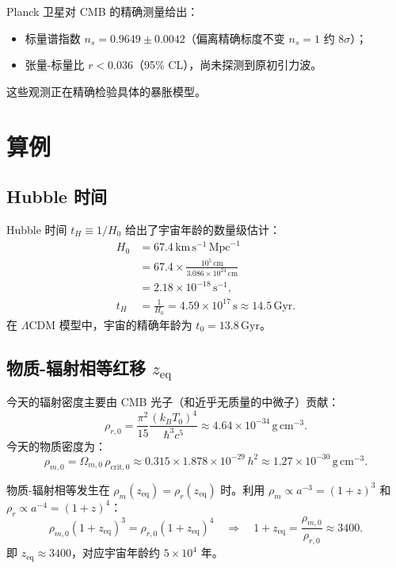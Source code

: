 \begin{note}[暴胀的观测检验]
Planck 卫星对 CMB 的精确测量给出：
\begin{itemize}
    \item 标量谱指数 $n_s = 0.9649 \pm 0.0042$（偏离精确标度不变 $n_s=1$ 约 $8\sigma$）；
    \item 张量-标量比 $r < 0.036$（95\% CL），尚未探测到原初引力波。
\end{itemize}
这些观测正在精确检验具体的暴胀模型。
\end{note}

\section{算例}
\label{sec:examples_cosmo}

\subsection{Hubble 时间}

Hubble 时间 $t_H \equiv 1/H_0$ 给出了宇宙年龄的数量级估计：
\begin{align}
    H_0 &= 67.4 \,\text{km}\,\text{s}^{-1}\,\text{Mpc}^{-1} \nonumber\\
        &= 67.4 \times \frac{10^5\,\text{cm}}{3.086 \times 10^{24}\,\text{cm}} \nonumber\\
        &= 2.18 \times 10^{-18} \,\text{s}^{-1}, \nonumber\\
    t_H &= \frac{1}{H_0} = 4.59 \times 10^{17}\,\text{s} \approx 14.5 \,\text{Gyr}.
\end{align}
在 $\Lambda$CDM 模型中，宇宙的精确年龄为 $t_0 = 13.8\,\text{Gyr}$。

\subsection{物质-辐射相等红移 $z_{\text{eq}}$}

\begin{example}[计算 $z_{\text{eq}}$]
今天的辐射密度主要由 CMB 光子（和近乎无质量的中微子）贡献：
\begin{equation}
    \rho_{r,0} = \frac{\pi^2}{15} \frac{(k_B T_0)^4}{\hbar^3 c^5} \approx 4.64 \times 10^{-34} \,\text{g}\,\text{cm}^{-3}.
\end{equation}
今天的物质密度为：
\begin{equation}
    \rho_{m,0} = \Omega_{m,0} \,\rho_{\text{crit},0} \approx 0.315 \times 1.878 \times 10^{-29} \,h^2 \approx 1.27 \times 10^{-30} \,\text{g}\,\text{cm}^{-3}.
\end{equation}

物质-辐射相等发生在 $\rho_m(z_{\text{eq}}) = \rho_r(z_{\text{eq}})$ 时。利用 $\rho_m \propto a^{-3} = (1+z)^3$ 和 $\rho_r \propto a^{-4} = (1+z)^4$：
\begin{equation}
    \rho_{m,0}(1+z_{\text{eq}})^3 = \rho_{r,0}(1+z_{\text{eq}})^4
    \quad\Longrightarrow\quad
    \boxed{1 + z_{\text{eq}} = \frac{\rho_{m,0}}{\rho_{r,0}} \approx 3400}.
\end{equation}
即 $z_{\text{eq}} \approx 3400$，对应宇宙年龄约 $5 \times 10^4$ 年。
\end{example}

